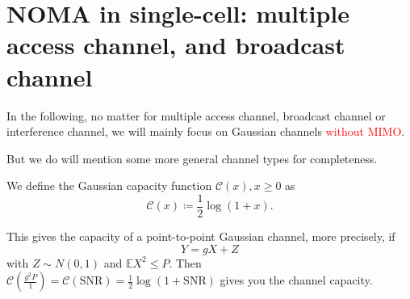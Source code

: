 \documentclass[aspectratio=43, 10pt]{beamer}
\begin{document}
\section{NOMA in single-cell: multiple access channel, and broadcast channel}
    \begin{frame}
        In the following, no matter for multiple access channel, broadcast channel or interference channel, we will mainly focus on Gaussian channels \textcolor{red}{without MIMO}. 

        \vfill
        But we do will mention some more general channel types for completeness. 

        \vfill 
        \begin{definition}
        We define the Gaussian capacity function $\mathcal{C}(x), x\geq 0$ as
            $$\mathcal{C}(x) \coloneqq \frac{1}{2}\log(1+x).$$ 
        \end{definition}
                
        This gives the capacity of a point-to-point Gaussian channel, more precisely, if $$Y=gX + Z$$ with $Z\sim N(0,1)$ and $\mathbb{E} X^2 \leq P$. Then $\mathcal{C}(\frac{g^2 P}{1})= \mathcal{C}(\text{SNR}) = \frac{1}{2}\log(1+\text{SNR})$ gives you the channel capacity. 
    \end{frame}
\end{document}
